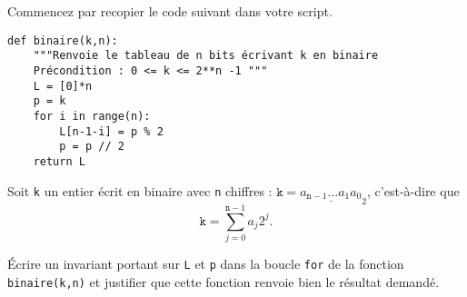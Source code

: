 \exer{}
\setcounter{numques}{0}

Commencez par recopier le code suivant dans votre script. 

\begin{lstlisting}
def binaire(k,n):
    """Renvoie le tableau de n bits écrivant k en binaire
    Précondition : 0 <= k <= 2**n -1 """
    L = [0]*n
    p = k
    for i in range(n):
        L[n-1-i] = p % 2
        p = p // 2
    return L
\end{lstlisting}



Soit \texttt{k} un entier écrit en binaire avec \texttt{n} chiffres : $\texttt{k} = \underline{a_{\texttt{n}-1}\ldots a_{1}a_{0}}_{2}$, c'est-à-dire que 
\begin{equation*}
  \texttt{k} = \sum_{j=0}^{\texttt{n}-1} a_j 2^j.
\end{equation*}



\question{} Écrire un invariant portant sur \texttt{L} et \texttt{p} dans la boucle \texttt{for} de la fonction \texttt{binaire(k,n)} et justifier que cette fonction renvoie bien le résultat demandé.
